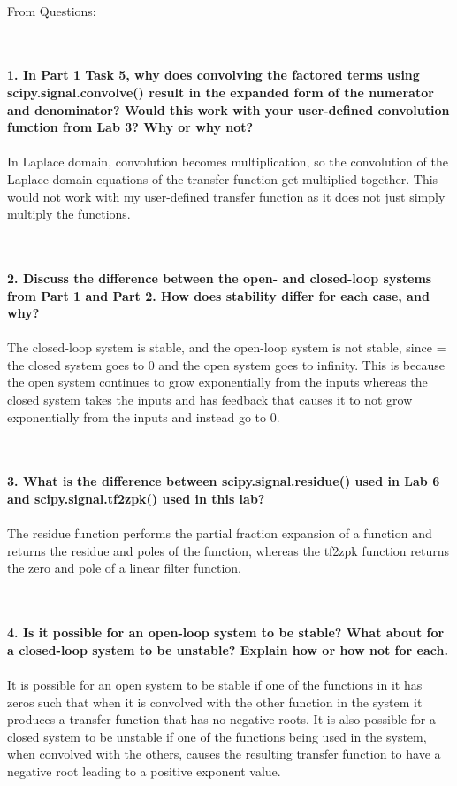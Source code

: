 \documentclass[12pt]{report}
\begin{document}
\\ From Questions:

\\ \\ \textbf{1. In Part 1 Task 5, why does convolving the factored terms using scipy.signal.convolve() result in the expanded form of the numerator and denominator? Would this work with your user-defined convolution function from Lab 3? Why or why not?}
\\ \\ In Laplace domain, convolution becomes multiplication, so the convolution of the Laplace domain equations of the transfer function get multiplied together. This would not work with my user-defined transfer function as it does not just simply multiply the functions.

\\ \\ \textbf{2. Discuss the difference between the open- and closed-loop systems from Part 1 and Part 2. How does stability differ for each case, and why?}
\\ \\The closed-loop system is stable, and the open-loop system is not stable, since = the closed system goes to 0 and the open system goes to infinity. This is because the open system continues to grow exponentially from the inputs whereas the closed system takes the inputs and has feedback that causes it to not grow exponentially from the inputs and instead go to 0.

\\ \\ \textbf{3. What is the difference between scipy.signal.residue() used in Lab 6 and scipy.signal.tf2zpk() used in this lab?}
\\ \\The residue function performs the partial fraction expansion of a function and returns the residue and poles of the function, whereas the tf2zpk function returns the zero and pole of a linear filter function.

\\ \\ \textbf{4. Is it possible for an open-loop system to be stable? What about for a closed-loop system to be unstable? Explain how or how not for each.}
\\ \\It is possible for an open system to be stable if one of the functions in it has zeros such that when it is convolved with the other function in the system it produces a transfer function that has no negative roots. It is also possible for a closed system to be unstable if one of the functions being used in the system, when convolved with the others, causes the resulting transfer function to have a negative root leading to a positive exponent value.
\end{document}
